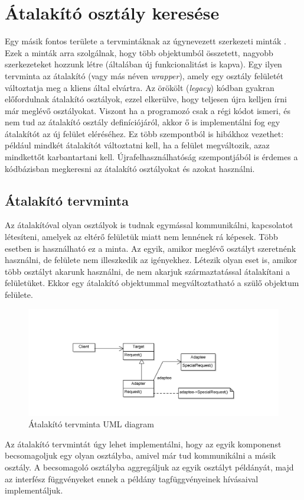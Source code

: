 \documentclass[a4paper,12pt]{report}
\begin{document}
\section{Átalakító osztály keresése}
Egy másik fontos területe a tervmintáknak az úgynevezett szerkezeti minták \cite{design_patterns}. Ezek a minták arra szolgálnak, hogy több objektumból összetett, nagyobb szerkezeteket hozzunk létre (általában új funkcionalitást is kapva). Egy ilyen tervminta az átalakító (vagy más néven \textit{wrapper}), amely egy osztály felületét változtatja meg a kliens által elvártra. Az örökölt (\textit{legacy}) kódban gyakran előfordulnak átalakító osztályok, ezzel elkerülve, hogy teljesen újra kelljen írni már meglévő osztályokat. Viszont ha a programozó csak a régi kódot ismeri, és nem tud az átalakító osztály definíciójáról, akkor ő is implementálni fog egy átalakítót az új felület eléréséhez. Ez több szempontból is hibákhoz vezethet: például mindkét átalakítót változtatni kell, ha a felület megváltozik, azaz mindkettőt karbantartani kell. Újrafelhasználhatóság szempontjából is érdemes a kódbázisban megkeresni az átalakító osztályokat és azokat használni.
\subsection{Átalakító tervminta}
Az átalakítóval olyan osztályok is tudnak egymással kommunikálni, kapcsolatot létesíteni, amelyek az eltérő felületük miatt nem lennének rá képesek. Több esetben is használható ez a minta. Az egyik, amikor meglévő osztályt szeretnénk használni, de felülete nem illeszkedik az igényekhez. Létezik olyan eset is, amikor több osztályt akarunk használni, de nem akarjuk származtatással átalakítani a felületüket. Ekkor egy átalakító objektummal megváltoztatható a szülő objektum felülete.
\begin{figure}
	\caption{Átalakító tervminta UML diagram}
	\centering
	\includegraphics[width=15cm,keepaspectratio]{adapter.png}
\end{figure}
\par Az átalakító tervmintát úgy lehet implementálni, hogy az egyik komponenst becsomagoljuk egy olyan osztályba, amivel már tud kommunikálni a másik osztály. A becsomagoló osztályba aggregáljuk az egyik osztályt példányát, majd az interfész függvényeket ennek a példány tagfüggvényeinek hívásaival implementáljuk.
\end{document}
